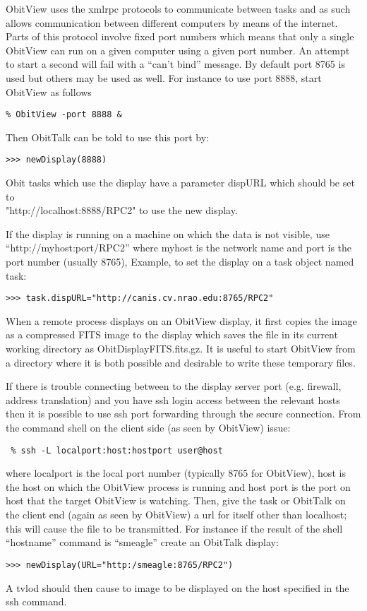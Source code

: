 \documentclass[11pt]{report}
\begin{document}
ObitView uses the xmlrpc protocols to communicate between tasks and as
such allows communication between different computers by means of the
internet.
Parts of this protocol involve fixed port numbers which means that only
a single ObitView can run on a given computer using a given port
number.
An attempt to start a second will fail with a ``can't bind'' message.
By default port 8765 is used but others may be used as well.
For instance to use port 8888, start ObitView as follows
\begin{verbatim}
% ObitView -port 8888 &
\end{verbatim}
Then ObitTalk can be told to use this port by:
\begin{verbatim}
>>> newDisplay(8888)
\end{verbatim}
Obit tasks which use the display have a parameter dispURL which should
be set to\\
"http://localhost:8888/RPC2" to use the new display.

If the display is running on a machine on which the data is not
visible, use ``http://myhost:port/RPC2'' where myhost is the network
name and port is the port number (usually 8765), Example, to set
the display on a task object named task:
\begin{verbatim}
>>> task.dispURL="http://canis.cv.nrao.edu:8765/RPC2"
\end{verbatim}
When a remote process displays on an ObitView display, it first copies
the image as a compressed FITS image to the display which saves the
file in its current working directory as ObitDisplayFITS.fits.gz.
It is useful to start ObitView from a directory where it is both
possible and desirable to write these temporary files.

If there is trouble connecting between to the display server port
(e.g. firewall, address translation) and you have ssh login access
between the relevant hosts then it is possible to use ssh port
forwarding through the secure connection.
From the command shell on the client side (as seen by ObitView)
issue:
\begin{verbatim}
 % ssh -L localport:host:hostport user@host
\end{verbatim}
where localport is the local port number (typically 8765 for
ObitView), host is the host on which the ObitView process is running
and host port is the port on host that the target ObitView is
watching.
Then, give the task or ObitTalk on the client end (again as seen by
ObitView) a url for itself other than localhost; this will cause the
file to be transmitted.
For instance if the result of the shell ``hostname'' command is
``smeagle'' create an ObitTalk display:
\begin{verbatim}
>>> newDisplay(URL="http:/smeagle:8765/RPC2")
\end{verbatim}
A tvlod should then cause to image to be displayed on the host
specified in the ssh command.
\end{document}
